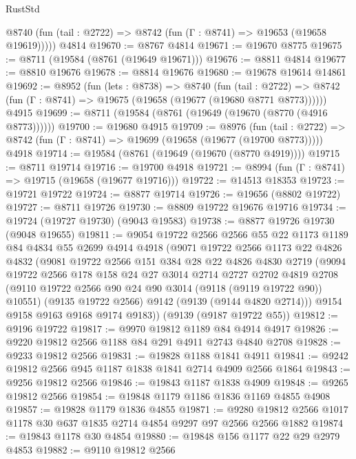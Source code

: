 \begin{lexlean}{RustStd}
\begin{coremodule}
      @8740 (fun (tail : @2722) => @8742 (fun (Γ : @8741) => @19653 (@19658 @19619)))))
    @4814
@19670 := @8767 @4814
@19671 := @19670 @8775
@19675 := @8711 (@19584 (@8761 (@19649 @19671)))
@19676 := @8811 @4814
@19677 := @8810 @19676
@19678 := @8814 @19676
@19680 := @19678 @19614 @14861
@19692 := @8952
    (fun (lets : @8738) =>
    @8740
      (fun (tail : @2722) =>
      @8742 (fun (Γ : @8741) => @19675 (@19658 (@19677 (@19680 @8771 @8773))))))
    @4915
@19699 := @8711 (@19584 (@8761 (@19649 (@19670 (@8770 (@4916 @8773))))))
@19700 := @19680 @4915
@19709 := @8976
    (fun (tail : @2722) => @8742 (fun (Γ : @8741) => @19699 (@19658 (@19677 (@19700 @8773)))))
    @4918
@19714 := @19584 (@8761 (@19649 (@19670 (@8770 @4919))))
@19715 := @8711 @19714
@19716 := @19700 @4918
@19721 := @8994 (fun (Γ : @8741) => @19715 (@19658 (@19677 @19716)))
@19722 := @14513 @18353
@19723 := @19721 @19722
@19724 := @8877 @19714
@19726 := @19656 (@8802 @19722)
@19727 := @8711 @19726
@19730 := @8809 @19722 @19676 @19716
@19734 := @19724 (@19727 @19730) (@9043 @19583)
@19738 := @8877 @19726 @19730 (@9048 @19655)
@19811 := @9054
    @19722
    @2566
    @2566
    @55
    @22
    @1173
    @1189
    @84
    @4834
    @55
    @2699
    @4914
    @4918
    (@9071
      @19722
      @2566
      @1173
      @22
      @4826
      @4832
      (@9081
        @19722
        @2566
        @151
        @384
        @28
        @22
        @4826
        @4830
        @2719
        (@9094
          @19722
          @2566
          @178
          @158
          @24
          @27
          @3014
          @2714
          @2727
          @2702
          @4819
          @2708
          (@9110 @19722 @2566 @90 @24 @90 @3014 (@9118 (@9119 @19722 @90)) @10551)
          (@9135 @19722 @2566)
          @9142
          (@9139 (@9144 @4820 @2714)))
        @9154
        @9158
        @9163
        @9168
        @9174
        @9183))
    (@9139 (@9187 @19722 @55))
@19812 := @9196 @19722
@19817 := @9970 @19812 @1189 @84 @4914 @4917
@19826 := @9220 @19812 @2566 @1188 @84 @291 @4911 @2743 @4840 @2708
@19828 := @9233 @19812 @2566
@19831 := @19828 @1188 @1841 @4911
@19841 := @9242 @19812 @2566 @945 @1187 @1838 @1841 @2714 @4909 @2566 @1864
@19843 := @9256 @19812 @2566
@19846 := @19843 @1187 @1838 @4909
@19848 := @9265 @19812 @2566
@19854 := @19848 @1179 @1186 @1836 @1169 @4855 @4908
@19857 := @19828 @1179 @1836 @4855
@19871 := @9280 @19812 @2566 @1017 @1178 @30 @637 @1835 @2714 @4854 @9297 @97 @2566 @2566 @1882
@19874 := @19843 @1178 @30 @4854
@19880 := @19848 @156 @1177 @22 @29 @2979 @4853
@19882 := @9110 @19812 @2566

\end{coremodule}
\end{lexlean}
